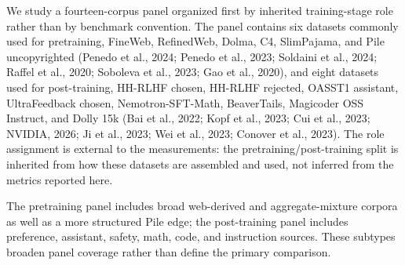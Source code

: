 \documentclass[11pt]{article}
\begin{document}
We study a fourteen-corpus panel organized first by inherited training-stage role rather than by benchmark convention. The panel contains six datasets commonly used for pretraining, FineWeb, RefinedWeb, Dolma, C4, SlimPajama, and Pile uncopyrighted (Penedo et al., 2024; Penedo et al., 2023; Soldaini et al., 2024; Raffel et al., 2020; Soboleva et al., 2023; Gao et al., 2020), and eight datasets used for post-training, HH-RLHF chosen, HH-RLHF rejected, OASST1 assistant, UltraFeedback chosen, Nemotron-SFT-Math, BeaverTails, Magicoder OSS Instruct, and Dolly 15k (Bai et al., 2022; Kopf et al., 2023; Cui et al., 2023; NVIDIA, 2026; Ji et al., 2023; Wei et al., 2023; Conover et al., 2023). The role assignment is external to the measurements: the pretraining/post-training split is inherited from how these datasets are assembled and used, not inferred from the metrics reported here.

The pretraining panel includes broad web-derived and aggregate-mixture corpora as well as a more structured Pile edge; the post-training panel includes preference, assistant, safety, math, code, and instruction sources. These subtypes broaden panel coverage rather than define the primary comparison.
\end{document}
